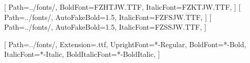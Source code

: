 \pagestyle{fancy} %
\fancyhf{} %

\fancyhead[L]{\myauthor} %
\fancyhead[R]{\mydate} %

\cfoot{\thepage\ / \pageref*{LastPage}} %




\usepackage[T1]{fontenc} %
\usepackage{anyfontsize}
\usepackage{libertine} %

[ %
    Path=../fonts/,
    BoldFont=FZHTJW.TTF, %
    ItalicFont=FZKTJW.TTF, %
]
[ %
    Path=../fonts/,
    AutoFakeBold=1.5,  %
    ItalicFont=FZFSJW.TTF, %
]
[ %
    Path=../fonts/,
    AutoFakeBold=1.5,  %
    ItalicFont=FZSSJW.TTF, %
] 

\setmonofont{MapleMono-NF-CN}[ %
    Path=../fonts/, %
    Extension=.ttf, %
    UprightFont=*-Regular, %
    BoldFont=*-Bold, %
    ItalicFont=*-Italic, %
    BoldItalicFont=*-BoldItalic, %
]


\renewcommand*{\proofname}{\normalfont\bfseries Proof}

\usepackage{thmtools}


